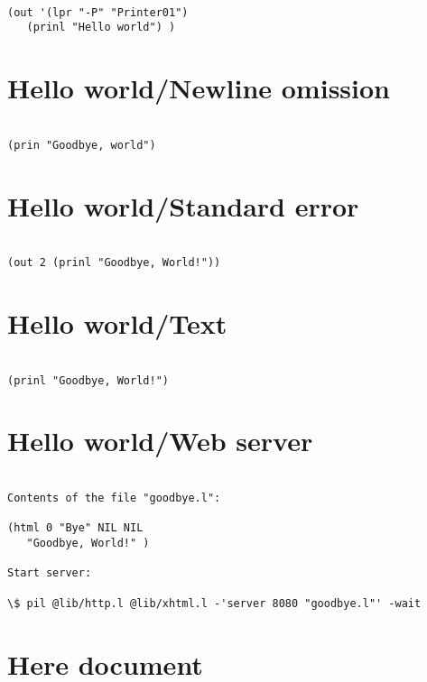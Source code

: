 \begin{verbatim}

(out '(lpr "-P" "Printer01")
   (prinl "Hello world") )

\end{verbatim}

\section*{Hello world/Newline omission}

\begin{verbatim}

(prin "Goodbye, world")

\end{verbatim}

\section*{Hello world/Standard error}

\begin{verbatim}

(out 2 (prinl "Goodbye, World!"))

\end{verbatim}

\section*{Hello world/Text}

\begin{verbatim}

(prinl "Goodbye, World!")

\end{verbatim}

\section*{Hello world/Web server}

\begin{verbatim}

Contents of the file "goodbye.l":

(html 0 "Bye" NIL NIL
   "Goodbye, World!" )

Start server:

\$ pil @lib/http.l @lib/xhtml.l -'server 8080 "goodbye.l"' -wait

\end{verbatim}

\section*{Here document}

